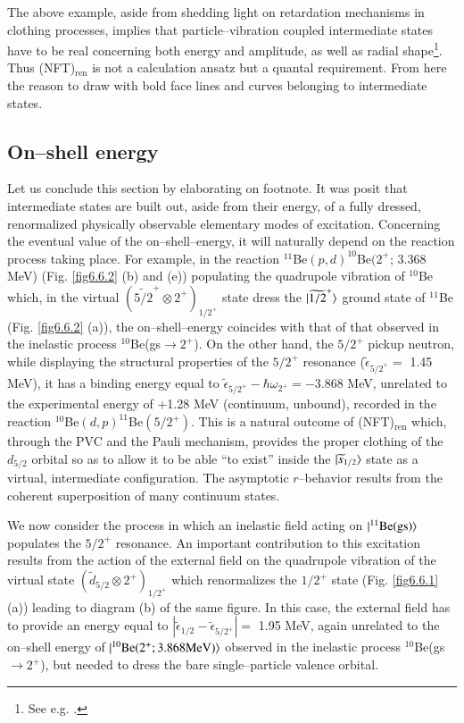 The above example, aside from shedding light on retardation mechanisms in clothing processes, implies that particle--vibration coupled intermediate states have to be real concerning both energy and amplitude, as well as radial shape\footnote{See e.g. \cite{Barranco:17}.}. Thus (NFT)$_{\text{ren}}$ is not a calculation ansatz but a quantal requirement. From here the reason to draw with bold face lines and curves belonging to intermediate states.

\subsection{On--shell energy}
 Let us conclude this section by elaborating on footnote. It was posit that intermediate states are built out, aside from their energy, of a fully dressed, renormalized physically observable elementary modes of excitation. Concerning the eventual value of the on--shell--energy, it will naturally depend on the reaction process taking place.
For example, in the reaction $^{11}$Be$(p,d)^{10}$Be$(2^+$; 3.368 MeV) (Fig. \ref{fig6.6.2} (b) and (e)) populating the quadrupole vibration of $^{10}$Be which, in the virtual $(\widetilde{5/2}^+\otimes 2^+)_{1/2^+}$ state dress the $|{\widetilde{1/2}^+} \rangle$ ground state of $^{11}$Be (Fig. \ref{fig6.6.2} (a)), the on--shell--energy coincides with that of that observed in the inelastic process $^{10}$Be(gs$\to 2^+$). On the other hand, the $5/2^+$ pickup neutron, while displaying the structural properties of the $5/2^+$ resonance ($\tilde{\epsilon}_{{5/2}^+}=$ 1.45 MeV), it has a binding energy equal to $\tilde{\epsilon}_{{5/2}^+}-\hbar\omega_{2^+}=-3.868$ MeV, unrelated to the experimental energy of +1.28 MeV (continuum, unbound), recorded in the reaction $^{10}$Be$(d,p)^{11}$Be$(5/2^+)$. This is a natural outcome of (NFT)$_{\text{ren}}$ which, through the PVC and the Pauli mechanism, provides the proper clothing of the $d_{5/2}$ orbital so as to allow it to be able ``to exist'' inside the $|{\widetilde s_{1/2}} \rangle$ state as a virtual, intermediate configuration. The asymptotic $r$--behavior results from the coherent superposition of many continuum states.


 We now consider the process in which an inelastic field acting on $|{^{11}\text{Be(gs)}} \rangle$ populates the $5/2^+$ resonance. An important contribution to this excitation results from the action of the external field on the quadrupole vibration of the virtual state $(\tilde d_{5/2}\otimes 2^+)_{1/2^+}$ which renormalizes the $1/2^+$ state (Fig. \ref{fig6.6.1} (a)) leading to diagram (b) of the same figure. In this case, the external field has to provide an energy equal to $|\tilde \epsilon_{1/2}-\tilde \epsilon_{5/2^+}|=$ 1.95 MeV, again unrelated to the on--shell energy of $|{^{10}\text{Be}(2^+; 3.868\text{MeV})} \rangle$ observed in the inelastic process $^{10}$Be(gs$\to2^+$), but needed to dress the bare single--particle valence orbital.
